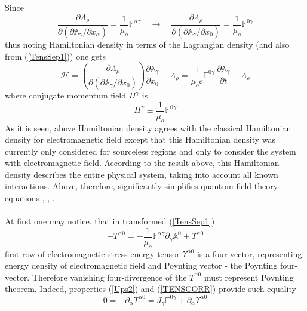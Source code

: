 \documentclass[aps,prx,preprint,groupedaddress,showkeys]{revtex4-2}
\begin{document}
Since 
\begin{equation} \label{HQ1}
\frac{\partial \Lambda_{\rho}}{\partial (\partial \mathbb{A}_{\gamma} / \partial x_{\alpha})}  = \frac{1}{\mu_o} \mathbb{F}^{\alpha \gamma} \quad \to \quad \frac{\partial \Lambda_{\rho}}{\partial (\partial \mathbb{A}_{\gamma} / \partial x_0)} = \frac{1}{\mu_o} \mathbb{F}^{0 \gamma}
\end{equation}
thus noting Hamiltonian density in terms of the Lagrangian density \cite{LDEM} (and also from (\ref{TensSep1})) one gets
\begin{equation} \label{HQ2}
\mathcal{H} = \left ( \frac{\partial \Lambda_{\rho}}{\partial (\partial \mathbb{A}_{\gamma} / \partial x_0)} \right ) \frac{\partial \mathbb{A}_{\gamma}}{\partial x_0} - \Lambda_{\rho} = \frac{1}{\mu_o c} \mathbb{F}^{0 \gamma} \, \frac{\partial \mathbb{A}_{\gamma}}{\partial t} - \Lambda_{\rho}
\end{equation}
where conjugate momentum field $\Pi^{\gamma}$ is
\begin{equation} \label{HQ3}
\Pi^{\gamma} \equiv \frac{1}{\mu_o} \mathbb{F}^{0 \gamma}
\end{equation}
As it is seen, above Hamiltonian density agrees with the classical Hamiltonian density for electromagnetic field \cite{LDEM} except that this Hamiltonian density was currently only considered for sourceless regions and only to consider the system with electromagnetic field. According to the result above, this Hamiltonian density describes the entire physical system, taking into account all known interactions. Above, therefore, significantly simplifies quantum field theory equations  \cite{QFT1}, \cite{QFT2}, \cite{QFT3}.\\
~\\
At first one may notice, that in transformed (\ref{TensSep1})
\begin{equation} \label{HQ4}
- T^{\alpha 0} =  - \frac{1}{\mu_o} \mathbb{F}^{\alpha \gamma} \partial_{\gamma} \mathbb{A}^{0} + \Upsilon^{\alpha 0}
\end{equation}
first row of electromagnetic stress-energy tensor $\Upsilon^{\alpha 0}$ is a four-vector, representing energy density of electromagnetic field and Poynting vector \cite{PoV} - the Poynting four-vector. Therefore vanishing four-divergence of the $T^{\alpha 0}$ must represent Poynting theorem. Indeed, properties (\ref{Ups2}) and (\ref{TENSCORR}) provide such equality
\begin{equation} \label{HQ5}
0 = - \partial_{\alpha} T^{\alpha 0} = J_{\gamma} \mathbb{F}^{0 \gamma} + \partial_{\alpha} \Upsilon^{\alpha 0} 
\end{equation}
\end{document}
